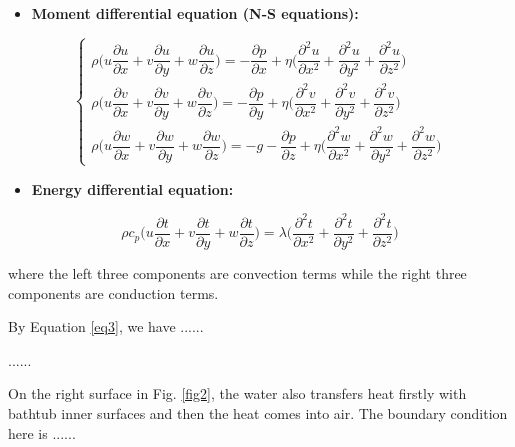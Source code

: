 \documentclass{mcmthesis}
\begin{document}
\begin{itemize}
\item {\bf Moment differential equation (N-S equations):}
\end{itemize}

\begin{equation} \label{eq2}
\left\{
\begin{array}{l} \!\!
\rho \Big(u \dfrac{\partial u}{\partial x} + v \dfrac{\partial u}{\partial y} + w\dfrac{\partial u}{\partial z} \Big) = -\dfrac{\partial p}{\partial x} + \eta \Big(\dfrac{\partial^2 u}{\partial x^2} + \dfrac{\partial^2 u}{\partial y^2} + \dfrac{\partial^2 u}{\partial z^2} \Big) \\[0.3cm]
\rho \Big(u \dfrac{\partial v}{\partial x} + v \dfrac{\partial v}{\partial y} + w\dfrac{\partial v}{\partial z} \Big) = -\dfrac{\partial p}{\partial y} + \eta \Big(\dfrac{\partial^2 v}{\partial x^2} + \dfrac{\partial^2 v}{\partial y^2} + \dfrac{\partial^2 v}{\partial z^2} \Big) \\[0.3cm]
\rho \Big(u \dfrac{\partial w}{\partial x} + v \dfrac{\partial w}{\partial y} + w\dfrac{\partial w}{\partial z} \Big) = -g-\dfrac{\partial p}{\partial z} + \eta \Big(\dfrac{\partial^2 w}{\partial x^2} + \dfrac{\partial^2 w}{\partial y^2} + \dfrac{\partial^2 w}{\partial z^2} \Big)  
\end{array}
\right.
\end{equation}

\begin{itemize}
\item {\bf Energy differential equation:}
\end{itemize}

\begin{equation} \label{eq3}
\rho c_p \Big( u\frac{\partial t}{\partial x} + v\frac{\partial t}{\partial y} + w\frac{\partial t}{\partial z} \Big) = \lambda \Big(\frac{\partial^2 t}{\partial x^2} + \frac{\partial^2 t}{\partial y^2} + \frac{\partial^2 t}{\partial z^2} \Big)
\end{equation}

\noindent where the left three components are convection terms while the right three components are conduction terms.

By Equation \eqref{eq3}, we have ......

......

On the right surface in Fig. \ref{fig2}, the water also transfers heat firstly with bathtub inner surfaces and then the heat comes into air. The boundary condition here is ......
\end{document}
